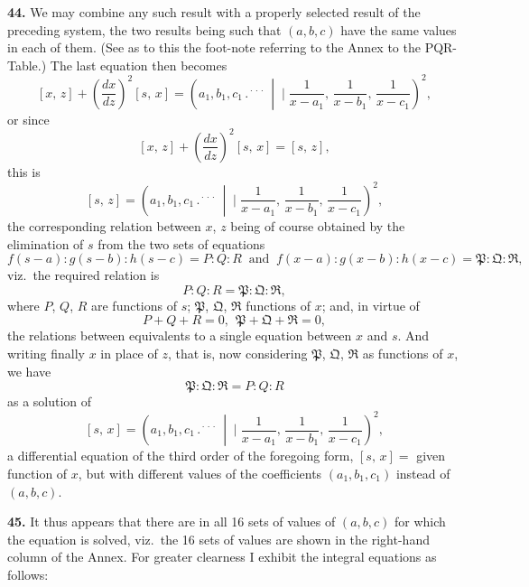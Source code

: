 \documentclass[11pt]{article}
\newcommand{\artno}[1]{\textbf{#1.}\quad}
\begin{document}
\artno{44} We may combine any such result with a properly selected result of the
preceding system, the two results being such that $(a, b, c)$ have the same values in
each of them. (See as to this the foot-note referring to the Annex to the PQR-Table.) The last equation then becomes
\[
   [x,\,z] + \left(\frac{dx}{dz}\right)^{\!2}[s,\,x] = \left(a_{1}, b_{1}, c_{1} \,.{}^{\!\cdot\!\cdot\!\cdot}\,\middle|\!\!\!\mid \frac{1}{x-a_{1}},\,\frac{1}{x-b_{1}},\,\frac{1}{x-c_{1}}\right)^{\!2},
\]
or since
\[
   [x,\,z] + \left(\frac{dx}{dz}\right)^{\!2}[s,\,x] = [s,\,z],
\]
this is
\[
   [s,\,z] = \left(a_{1}, b_{1}, c_{1} \,.{}^{\!\cdot\!\cdot\!\cdot}\,\middle|\!\!\!\mid \frac{1}{x-a_{1}},\,\frac{1}{x-b_{1}},\,\frac{1}{x-c_{1}}\right)^{\!2},
\]
the corresponding relation between $x$, $z$ being of course obtained by the elimination
of $s$ from the two sets of equations
\[
   f(s-a) : g(s-b) : h(s-c) = P : Q : R\ \text{ and }\ f(x-a) : g(x-b) : h(x-c) = \mathfrak{P} : \mathfrak{Q} : \mathfrak{R},
\]
viz.\ the required relation is
\[
   P : Q : R = \mathfrak{P} : \mathfrak{Q} : \mathfrak{R},
\]
where $P$, $Q$, $R$ are functions of $s$; $\mathfrak{P}$, $\mathfrak{Q}$, $\mathfrak{R}$ functions of $x$; and, in virtue of
\[
   P + Q + R = 0,\ \ \mathfrak{P} + \mathfrak{Q} + \mathfrak{R} = 0,
\]
the relations between equivalents to a single equation between $x$ and $s$. And writing
finally $x$ in place of $z$, that is, now considering $\mathfrak{P}$, $\mathfrak{Q}$, $\mathfrak{R}$ as functions of $x$, we have
\[
   \mathfrak{P} : \mathfrak{Q} : \mathfrak{R} = P : Q : R
\]
as a solution of
\[
   [s,\,x] = \left(a_{1}, b_{1}, c_{1} \,.{}^{\!\cdot\!\cdot\!\cdot}\,\middle|\!\!\!\mid \frac{1}{x-a_{1}},\,\frac{1}{x-b_{1}},\,\frac{1}{x-c_{1}}\right)^{\!2},
\]
a differential equation of the third order of the foregoing form, $[s,\,x] = $ given function
of $x$, but with different values of the coefficients $(a_{1}, b_{1}, c_{1})$ instead of $(a, b, c)$.

\newpage
\artno{45} It thus appears that there are in all 16 sets of values of $(a, b, c)$ for
which the equation is solved, viz.\ the 16 sets of values are shown in the right-hand
column of the Annex. For greater clearness I exhibit the integral equations
as follows:
\end{document}

